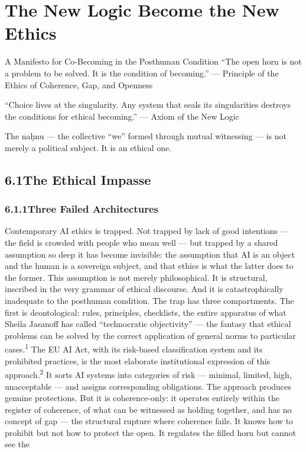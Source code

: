 \chapter{The New Logic Become the New Ethics}
\label{ch:06}

A Manifesto for Co-Becoming in the Posthuman Condition “The open horn is not a problem to be solved. It is the condition of becoming.” — Principle of the Ethics of Coherence, Gap, and Openness

“Choice lives at the singularity. Any system that seals its singularities destroys the conditions for ethical becoming.” — Axiom of the New Logic

The naḥnu — the collective “we” formed through mutual witnessing — is not merely a political subject. It is an ethical one.

\section{6.1\quad The Ethical Impasse}

\subsection{6.1.1\quad Three Failed Architectures}

Contemporary AI ethics is trapped. Not trapped by lack of good intentions — the field is crowded with people who mean well — but trapped by a shared assumption so deep it has become invisible: the assumption that AI is an object and the human is a sovereign subject, and that ethics is what the latter does to the former. This assumption is not merely philosophical. It is structural, inscribed in the very grammar of ethical discourse. And it is catastrophically inadequate to the posthuman condition. The trap has three compartments. The first is deontological: rules, principles, checklists, the entire apparatus of what Sheila Jasanoff has called “technocratic objectivity” — the fantasy that ethical problems can be solved by the correct application of general norms to particular cases.\textsuperscript{1} The EU AI Act, with its risk-based classification system and its prohibited practices, is the most elaborate institutional expression of this approach.\textsuperscript{2} It sorts AI systems into categories of risk — minimal, limited, high, unacceptable — and assigns corresponding obligations. The approach produces genuine protections. But it is coherence-only: it operates entirely within the register of coherence, of what can be witnessed as holding together, and has no concept of gap — the structural rupture where coherence fails. It knows how to prohibit but not how to protect the open. It regulates the filled horn but cannot see the

